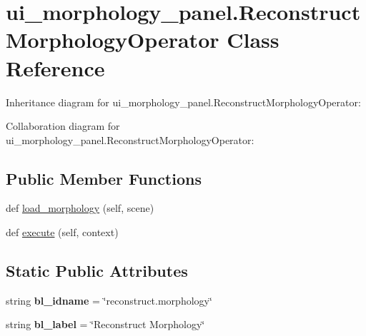\hypertarget{classui__morphology__panel_1_1ReconstructMorphologyOperator}{}\section{ui\+\_\+morphology\+\_\+panel.\+Reconstruct\+Morphology\+Operator Class Reference}
\label{classui__morphology__panel_1_1ReconstructMorphologyOperator}


Inheritance diagram for ui\+\_\+morphology\+\_\+panel.\+Reconstruct\+Morphology\+Operator\+:


Collaboration diagram for ui\+\_\+morphology\+\_\+panel.\+Reconstruct\+Morphology\+Operator\+:
\subsection*{Public Member Functions}
\begin{DoxyCompactItemize}
\item 
def \hyperlink{classui__morphology__panel_1_1ReconstructMorphologyOperator_a3336482aaa34463abb458587edb75a62}{load\+\_\+morphology} (self, scene)
\item 
def \hyperlink{classui__morphology__panel_1_1ReconstructMorphologyOperator_ac1e2deee03b953d627f3abaff02627c2}{execute} (self, context)
\end{DoxyCompactItemize}
\subsection*{Static Public Attributes}
\begin{DoxyCompactItemize}
\item 
string {\bfseries bl\+\_\+idname} = \char`\"{}reconstruct.\+morphology\char`\"{}\hypertarget{classui__morphology__panel_1_1ReconstructMorphologyOperator_a60613ede548df92e5a2cd8684eb69863}{}\label{classui__morphology__panel_1_1ReconstructMorphologyOperator_a60613ede548df92e5a2cd8684eb69863}

\item 
string {\bfseries bl\+\_\+label} = \char`\"{}Reconstruct Morphology\char`\"{}\hypertarget{classui__morphology__panel_1_1ReconstructMorphologyOperator_a25eb323293fca24e2255e3fcc5db2642}{}\label{classui__morphology__panel_1_1ReconstructMorphologyOperator_a25eb323293fca24e2255e3fcc5db2642}

\end{DoxyCompactItemize}


